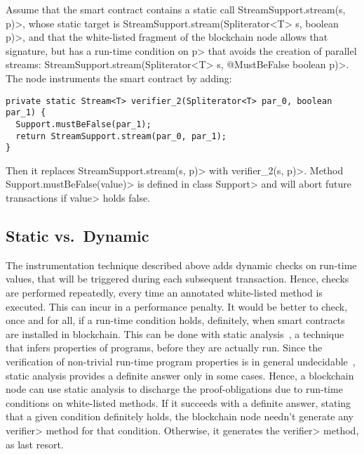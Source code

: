 Assume that the smart contract contains a static call
\<StreamSupport.stream(s, p)>, whose static target is
\<StreamSupport.stream(Spliterator$\text{<}$T$\text{>}$ s, boolean p)>,
and that the white-listed fragment of the blockchain node allows that signature,
but has a run-time condition on \<p> that avoids the creation of parallel streams:
\<StreamSupport.stream(Spliterator$\text{<}$T$\text{>}$ s, @MustBeFalse boolean p)>.
The node instruments the smart contract by adding:

{\scriptsize\begin{verbatim}
private static Stream<T> verifier_2(Spliterator<T> par_0, boolean par_1) {
  Support.mustBeFalse(par_1);
  return StreamSupport.stream(par_0, par_1);
}
\end{verbatim}}

\noindent
Then it replaces \<StreamSupport.stream(s, p)> with \<verifier\_2(s, p)>.
Method \<Support.mustBeFalse(value)> is defined in class \<Support> and
will abort future transactions if \<value> holds false.



\subsection{Static vs.\ Dynamic}\label{subsec:static_vs_dynamic}

The instrumentation technique described above adds dynamic checks on run-time values,
that will be triggered during each subsequent transaction.
Hence, checks are performed repeatedly, every time an annotated white-listed method
is executed. This can incur in a performance penalty. It would be better
to check, once and for all,
if a run-time condition holds, definitely, when smart contracts
are installed in blockchain.
This can be done with static analysis~\cite{NielsonNH99}, a technique that infers
properties of programs, before they are actually run. Since the verification of
non-trivial run-time program properties is in general undecidable~\cite{Rice53},
static analysis provides a definite answer
only in some cases. Hence, a blockchain node can use static analysis to discharge
the proof-obligations due to run-time conditions on white-listed methods. If it
succeeds with a definite answer, stating that a given condition definitely holds,
the blockchain node needn't generate any \<verifier> method for that condition. Otherwise, it
generates the \<verifier> method, as last resort.

